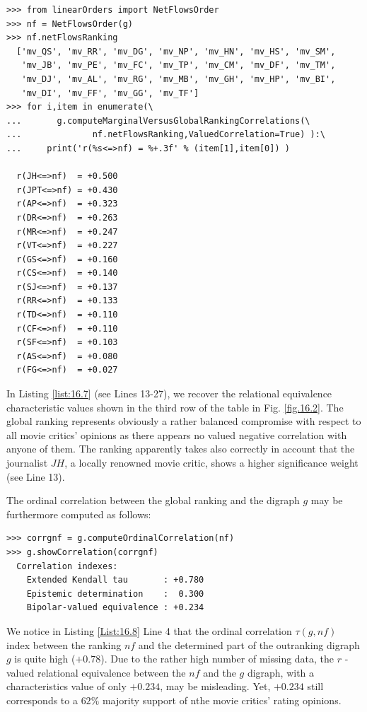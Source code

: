 \begin{lstlisting}[caption={Computing marginal criterion correlations with global \NetFlows ranking},label=list:16.7]
>>> from linearOrders import NetFlowsOrder
>>> nf = NetFlowsOrder(g)
>>> nf.netFlowsRanking
  ['mv_QS', 'mv_RR', 'mv_DG', 'mv_NP', 'mv_HN', 'mv_HS', 'mv_SM',
   'mv_JB', 'mv_PE', 'mv_FC', 'mv_TP', 'mv_CM', 'mv_DF', 'mv_TM',
   'mv_DJ', 'mv_AL', 'mv_RG', 'mv_MB', 'mv_GH', 'mv_HP', 'mv_BI',
   'mv_DI', 'mv_FF', 'mv_GG', 'mv_TF']
>>> for i,item in enumerate(\
...       g.computeMarginalVersusGlobalRankingCorrelations(\
...              nf.netFlowsRanking,ValuedCorrelation=True) ):\
...     print('r(%s<=>nf) = %+.3f' % (item[1],item[0]) )   

  r(JH<=>nf)  = +0.500
  r(JPT<=>nf) = +0.430
  r(AP<=>nf)  = +0.323
  r(DR<=>nf)  = +0.263
  r(MR<=>nf)  = +0.247
  r(VT<=>nf)  = +0.227
  r(GS<=>nf)  = +0.160
  r(CS<=>nf)  = +0.140
  r(SJ<=>nf)  = +0.137
  r(RR<=>nf)  = +0.133
  r(TD<=>nf)  = +0.110
  r(CF<=>nf)  = +0.110
  r(SF<=>nf)  = +0.103
  r(AS<=>nf)  = +0.080
  r(FG<=>nf)  = +0.027
\end{lstlisting}

In Listing \ref{list:16.7} (see Lines 13-27), we recover the relational equivalence characteristic values shown in the third row of the table in Fig. \ref{fig.16.2}. The global \NetFlows ranking represents obviously a rather balanced compromise with respect to all movie critics' opinions as there appears no valued negative correlation with anyone of them. The \NetFlows ranking apparently takes also correctly in account that the journalist $JH$, a locally renowned movie critic, shows a higher significance weight (see Line 13).

The ordinal correlation between the global \NetFlows ranking and the digraph $g$ may be furthermore computed as follows: 

\begin{lstlisting}[caption={Computing correlation between \NetFlows and global outranking },label=list:16.8]
>>> corrgnf = g.computeOrdinalCorrelation(nf)
>>> g.showCorrelation(corrgnf)
  Correlation indexes:
    Extended Kendall tau       : +0.780
    Epistemic determination    :  0.300
    Bipolar-valued equivalence : +0.234
\end{lstlisting}

We notice in Listing \ref{List:16.8} Line 4 that the ordinal correlation $\tau(g,nf)$ index between the \NetFlows ranking $nf$ and the determined part of the outranking digraph $g$ is quite high ($+0.78$). Due to the rather high number of missing data, the $r$ -valued relational equivalence between the $nf$ and the $g$ digraph, with a characteristics value of only $+0.234$, may be misleading. Yet, $+0.234$ still corresponds to a $62\%$ majority support of nthe movie critics' rating opinions.

